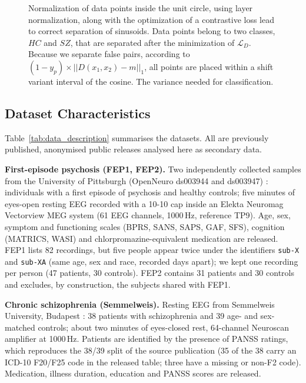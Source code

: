 \documentclass{article}
\begin{document}
\begin{figure}[ht]
\begin{tikzpicture}
        
    \end{tikzpicture}
    \caption{Normalization of data points inside the unit circle, using layer normalization, along with the optimization of a contrastive loss lead to correct separation of sinusoids. Data points belong to two classes, $HC$ and $SZ$, that are separated after the minimization of $\mathcal{L}_D$. Because we separate false pairs, according to $(1-y_p) \times ||D(x_1,x_2)-m||_1$, all points are placed within a shift variant interval of the cosine. The variance needed for classification.}
    \label{fig:sinusoid_separation}
\end{figure}

\subsection{Dataset Characteristics}\label{materials:data}

Table~\ref{tab:data_description} summarises the datasets. All are previously published, anonymised public releases analysed here as secondary data.

\noindent\textbf{First-episode psychosis (FEP1, FEP2).} Two independently collected samples from the University of Pittsburgh (OpenNeuro ds003944 and ds003947) \cite{salisbury_ds003944,salisbury_ds003947}: individuals with a first episode of psychosis and healthy controls; five minutes of eyes-open resting EEG recorded with a 10-10 cap inside an Elekta Neuromag Vectorview MEG system (61 EEG channels, 1000\,Hz, reference TP9). Age, sex, symptom and functioning scales (BPRS, SANS, SAPS, GAF, SFS), cognition (MATRICS, WASI) and chlorpromazine-equivalent medication are released. FEP1 lists 82 recordings, but five people appear twice under the identifiers \texttt{sub-X} and \texttt{sub-XA} (same age, sex and race, recorded days apart); we kept one recording per person (47 patients, 30 controls). FEP2 contains 31 patients and 30 controls and excludes, by construction, the subjects shared with FEP1.

\noindent\textbf{Chronic schizophrenia (Semmelweis).} Resting EEG from Semmelweis University, Budapest \cite{racz2025}: 38 patients with schizophrenia and 39 age- and sex-matched controls; about two minutes of eyes-closed rest, 64-channel Neuroscan amplifier at 1000\,Hz. Patients are identified by the presence of PANSS ratings, which reproduces the 38/39 split of the source publication (35 of the 38 carry an ICD-10 F20/F25 code in the released table; three have a missing or non-F2 code). Medication, illness duration, education and PANSS scores are released.
\end{document}
